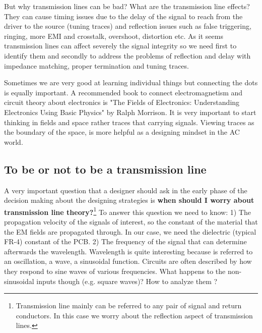 \documentclass[final]{cubedoc}
\begin{document}
	But why transmission lines can be bad? What are the transmission line effects? They can cause timing issues due to the delay of the signal to reach from the driver to the source (tuning traces) and reflection issues such as false triggering, ringing, more EMI and crosstalk, overshoot, distortion etc. As it seems transmission lines can affect severely the signal integrity so we need first to identify them and secondly to address the problems of reflection and delay with impedance matching, proper termination and tuning traces.
	
	Sometimes we are very good at learning individual things but connecting the dots is equally important. A recommended book to connect electromagnetism and circuit theory about electronics is "The Fields of Electronics: Understanding Electronics Using Basic Physics" by Ralph Morrison. It is very important to start thinking in fields and space rather traces that carrying signals. Viewing traces as the boundary of the space, is more helpful as a designing mindset in the AC world.
	
	\subsection{To be or not to be a transmission line}
	
	A very important question that a designer should ask in the early phase of the decision making about the designing strategies is \textbf{when should I worry about transmission line theory?}\footnote{Transmission line mainly can be referred to any pair of signal and return conductors. In this case we worry about the reflection aspect of transmission lines.} To answer this question we need to know: 1) The propagation velocity of the signals of interest, so the constant of the material that the EM fields are propagated through. In our case, we need the dielectric (typical FR-4) constant of the PCB. 2) The frequency of the signal that can determine afterwards the wavelength. Wavelength is quite interesting because is referred to an oscillation, a wave, a sinusoidal function. Circuits are often described by how they respond to sine waves of various frequencies. What happens to the non-sinusoidal inputs though (e.g. square waves)? How to analyze them \cite{morrison2002fields}? 
	
\end{document}
